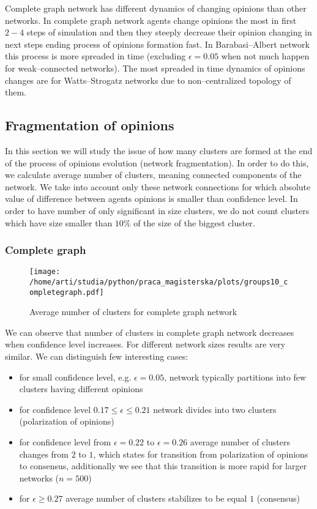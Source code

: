 \documentclass{article}
\begin{document}
Complete graph network has different dynamics of changing opinions than other networks. In complete graph network agents change opinions the most in first $2-4$ steps of simulation and then they steeply decrease their opinion changing in next steps ending process of opinions formation fast. In Barabasi--Albert network this process is more spreaded in time (excluding $\epsilon=0.05$ when not much happen for weak--connected networks). The most spreaded in time dynamics of opinions changes are for Watts--Strogatz networks due to non--centralized topology of them.


\subsection{Fragmentation of opinions}

In this section we will study the issue of how many clusters are formed at the end of the process of opinions evolution (network fragmentation). In order to do this, we calculate average number of clusters, meaning connected components of the network. We take into account only these network connections for which absolute value of difference between agents opinions is smaller than confidence level. In order to have number of only significant in size clusters, we do not count clusters which have size smaller than $10\%$ of the size of the biggest cluster.

\subsubsection{Complete graph}

\begin{figure}[H]
		\centering
		\texttt{[image: /home/arti/studia/python/praca\_magisterska/plots/groups10\_completegraph.pdf]}
		\caption{Average number of clusters for complete graph network}
\end{figure}

We can observe that number of clusters in complete graph network decreases when confidence level increases. For different network sizes results are very similar. We can distinguish few interesting cases:
\begin{itemize}
\item for small confidence level, e.g. $\epsilon = 0.05$, network typically partitions into few clusters having different opinions
\item for confidence level $0.17 \leq \epsilon \leq 0.21$ network divides into two clusters (polarization of opinions)
\item for confidence level from $\epsilon = 0.22$ to $\epsilon = 0.26$ average number of clusters changes from $2$ to $1$, which states for transition from polarization of opinions to consensus, additionally we see that this transition is more rapid for larger networks ($n=500$)
\item for $\epsilon \geq 0.27$ average number of clusters stabilizes to be equal $1$ (consensus)
\end{itemize} 
\end{document}
